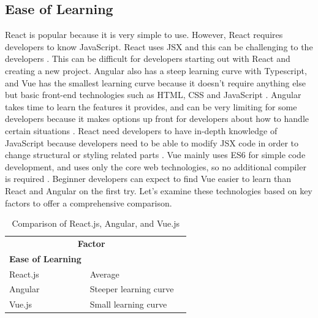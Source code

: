 \documentclass[10pt,journal,compsoc]{IEEEtran}
\begin{document}
\subsection{Ease of Learning}
React is popular because it is very simple to use. However, React requires developers to know JavaScript. React uses
JSX and this can be challenging to the developers \cite{cincovic2020comparison}. This can be difficult for developers starting out with React and creating a new project. Angular also has a steep learning curve with Typescript, and Vue has the smallest learning curve because it doesn't require
anything else but basic front-end technologies such as HTML, CSS and JavaScript \cite{cincovic2020comparison}. Angular takes time to learn the features it provides, and can be very limiting for some developers because it makes options up front for developers about how to handle certain situations  \cite{wohlgethan2018supportingweb}. React need developers to have in-depth knowledge of JavaScript because developers need to be able to modify JSX code in order to change structural
or styling related parts \cite{wohlgethan2018supportingweb}. Vue mainly uses ES6 for simple code development, and uses only the core web technologies, so no additional compiler is required \cite{wohlgethan2018supportingweb}. Beginner developers can expect to find Vue easier to learn than React and Angular on the first try. Let's examine these technologies based on key factors to offer a comprehensive comparison. 

\begin{table}[ht]
    \centering
    \begin{tabular}{llr}
        \hline
        \multicolumn{2}{c}{\textbf{Factor}} \\
        \cline{1-2}
        \textbf{Ease of Learning} & \\
        React.js & Average \cite{cincovic2020comparison}\\
        Angular & Steeper learning curve \cite{wohlgethan2018supportingweb}\\
        Vue.js & Small learning curve\cite{wohlgethan2018supportingweb} \\
        \hline
    \end{tabular}
    \caption{Comparison of React.js, Angular, and Vue.js}
    \label{tab:comparison}
\end{table}
\end{document}
